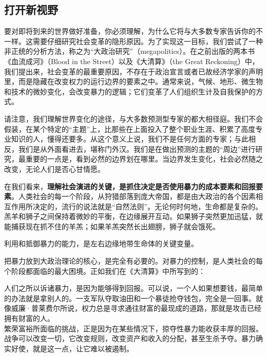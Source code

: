 \subsection{打开新视野}

要对即将到来的世界做好准备，你必须理解，为什么它将与大多数专家告诉你的不一样。这需要仔细研究社会变革的隐形原因。为了实现这一目标，我们尝试了一种非正统的分析方法，称之为“大政治研究”（megapolitics）。在之前出版的两本书《血流成河》（Blood in the Street）以及《大清算》（the Great Reckoning）中，我们提出来，社会变革的最重要原因，不存在于政治宣言或者已故经济学家的声明里，而是隐藏在改变权力的运行边界的要素之中。通常来说，气候、地形、微生物和技术的微妙变化，会改变暴力的逻辑；它们变革了人们组织生计及自我保护的方式。


请注意，我们理解世界变化的途径，与大多数预测型专家的都大相径庭。我们不会假装，在某个特定的“主题”上，比那些在上面投入了整个职业生涯、积累了高度专业知识的人，懂得还要多。从这个意义上说，我们不是任何方面的专家；与此相反，我们是从外面看进去，堪称门外汉。我们是在做出预测的主题的“周边”进行研究，最重要的一点是，看到必然的边界划在哪里。当边界发生变化，社会必然随之改变，无论人们是否心甘情愿。


在我们看来，\textbf{理解社会演进的关键，是抓住决定是否使用暴力的成本要素和回报要素}。人类社会的每一个阶段，从狩猎部落到庞大帝国，都是由大政治的各个因素相互作用所决定的，流行的说法就是“自然法则”。无论何时何地，生命都是复杂的。羔羊和狮子之间保持着微妙的平衡，在边缘展开互动。如果狮子突然更加迅猛，就能捕获现在抓不住的羊羔；如果羊羔突然长出翅膀，狮子就会饿死。


利用和抵御暴力的能力，是左右边缘地带生命体的关键变量。


把暴力放到大政治理论的核心，是完全有必要的。对暴力的控制，是人类社会的每个阶段都面临的最大困境。正如我们在《大清算》中所写到的：

\begin{tcolorbox}

人们之所以诉诸暴力，是因为能够得到回报。可以说，一个人如果想要钱，最简单的办法就是拿别人的。一支军队夺取油田和一个暴徒抢夺钱包，完全是一回事。就像威廉·普莱费尔所说，权力总是寻求通往财富的最现成的道路，那就是攻击已经拥有财富的人。\\

繁荣富裕所面临的挑战，正是因为在某些情况下，掠夺性暴力能收获丰厚的回报。战争可以改变一切，它改变规则，改变资产和收入的分配，甚至生杀予夺。暴力确实好使，就是这一点，让它难以被遏制。

\end{tcolorbox}

